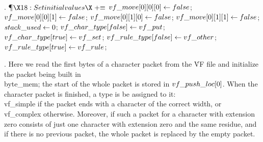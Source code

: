 . \P$\X18:Set initial values\X\mathrel{+}\S$\6
$\\{vf\_move}[0][0][0]\gets\\{false}$;\5
$\\{vf\_move}[0][0][1]\gets\\{false}$;\5
$\\{vf\_move}[0][1][0]\gets\\{false}$;\5
$\\{vf\_move}[0][1][1]\gets\\{false}$;\6
$\\{stack\_used}\gets0$;\6
$\\{vf\_char\_type}[\\{false}]\gets\\{vf\_put}$;\5
$\\{vf\_char\_type}[\\{true}]\gets\\{vf\_set}$;\6
$\\{vf\_rule\_type}[\\{false}]\gets\\{vf\_other}$;\5
$\\{vf\_rule\_type}[\\{true}]\gets\\{vf\_rule}$;\par
\fi

. Here we read the first bytes of a character packet from the \.{VF}
file and initialize the packet being built in \\{byte\_mem}; the start of
the whole packet is stored in $\\{vf\_push\_loc}[0]$. When the character
packet is finished, a type is be assigned to it: \\{vf\_simple} if the
packet ends with a character of the correct width, or \\{vf\_complex}
otherwise. Moreover, if such a packet for a character with
extension zero consists of just one character with extension zero and
the same residue, and if there is no previous packet, the whole packet
is replaced by the empty packet.

